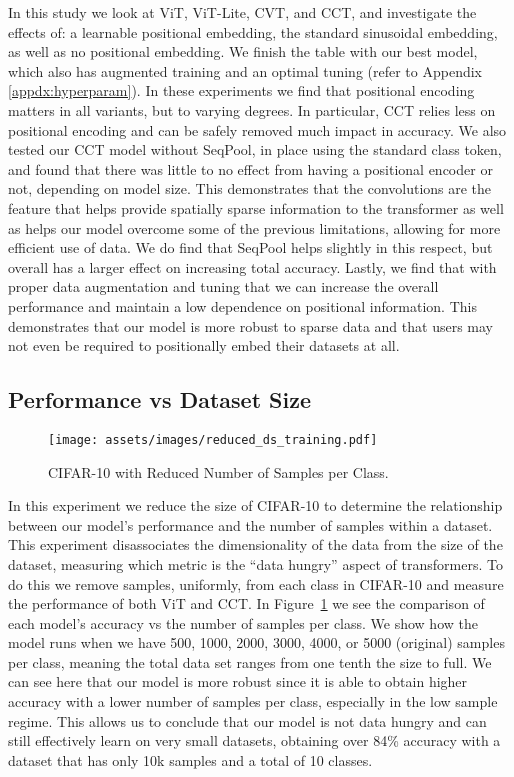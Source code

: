 \documentclass[10pt,twocolumn,letterpaper]{article}
\begin{document}
In this study we look at ViT, ViT-Lite, CVT, and CCT, and investigate the effects of: a learnable positional embedding, the standard sinusoidal embedding, as well as no positional embedding. 
We finish the table with our best model, which also has augmented training and an optimal tuning (refer to Appendix \ref{appdx:hyperparam}). 
In these experiments we find that positional encoding matters in all variants, but to varying degrees. In particular, CCT relies less on positional encoding and can be safely removed much impact in accuracy.
We also tested our CCT model without SeqPool, in place using the standard class token, and found that there was little to no effect from having a positional encoder or not, depending on model size. 
This demonstrates that the convolutions are the feature that helps provide spatially sparse information to the transformer as well as helps our model overcome some of the previous limitations, allowing for more efficient use of data.
We do find that SeqPool helps slightly in this respect, but overall has a larger effect on increasing total accuracy. 
Lastly, we find that with proper data augmentation and tuning that we can increase the overall performance and maintain a low dependence on positional information.
This demonstrates that our model is more robust to sparse data and that users may not even be required to positionally embed their datasets at all. 



\subsection{Performance vs Dataset Size}\label{sec:dataset}

\begin{figure}[ht]
\centering
\texttt{[image: assets/images/reduced\_ds\_training.pdf]}
\caption{CIFAR-10 with Reduced Number of Samples per Class.}
\label{fig:redruns}
\end{figure}

In this experiment we reduce the size of CIFAR-10 to determine the relationship between our model's performance and the number of samples within a dataset. 
This experiment disassociates the dimensionality of the data from the size of the dataset, measuring which metric is the ``data hungry'' aspect of transformers.
To do this we remove samples, uniformly, from each class in CIFAR-10 and measure the performance of both ViT and CCT. 
In Figure~\ref{fig:redruns} we see the comparison of each model's accuracy vs the number of samples per class. 
We show how the model runs when we have 500, 1000, 2000, 3000, 4000, or 5000 (original) samples per class, meaning the total data set ranges from one tenth the size to full. 
We can see here that our model is more robust since it is able to obtain higher accuracy with a lower number of samples per class, especially in the low sample regime.
This allows us to conclude that our model is not data hungry and can still effectively learn on very small datasets, obtaining over 84\% accuracy with a dataset that has only 10k samples and a total of 10 classes. 
\end{document}
